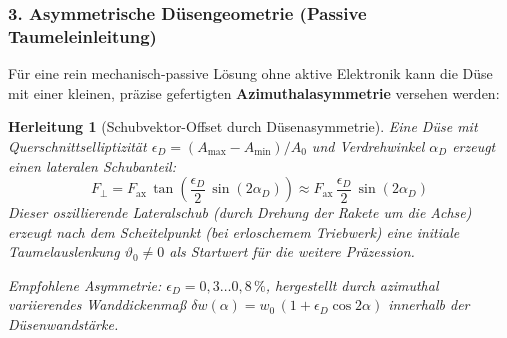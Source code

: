 ﻿\documentclass[12pt,a4paper]{article}
\newtheorem{herleitung}{Herleitung}[section]
\begin{document}
\subsubsection{3. Asymmetrische Düsengeometrie (Passive Taumeleinleitung)}

Für eine rein mechanisch-passive Lösung ohne aktive Elektronik kann die Düse mit
einer kleinen, präzise gefertigten \textbf{Azimuthalasymmetrie} versehen werden:

\begin{herleitung}[Schubvektor-Offset durch Düsenasymmetrie]
Eine Düse mit Querschnittselliptizität $\epsilon_D = (A_{\max} - A_{\min})/A_0$
und Verdrehwinkel $\alpha_D$ erzeugt einen lateralen Schubanteil:
\[
  F_\perp = F_{\mathrm{ax}}\,\tan\!\left(\frac{\epsilon_D}{2}\,\sin(2\alpha_D)\right)
  \approx F_{\mathrm{ax}}\,\frac{\epsilon_D}{2}\,\sin(2\alpha_D)
\]
Dieser oszillierende Lateralschub (durch Drehung der Rakete um die Achse) erzeugt
nach dem Scheitelpunkt (bei erloschemem Triebwerk) eine initiale Taumelauslenkung
$\vartheta_0 \neq 0$ als Startwert für die weitere Präzession.

Empfohlene Asymmetrie: $\epsilon_D = 0{,}3\ldots0{,}8\,\%$, hergestellt durch
azimuthal variierendes Wanddickenmaß $\delta w(\alpha) = w_0\,(1+\epsilon_D\cos 2\alpha)$
innerhalb der Düsenwandstärke.
\end{herleitung}
\end{document}
